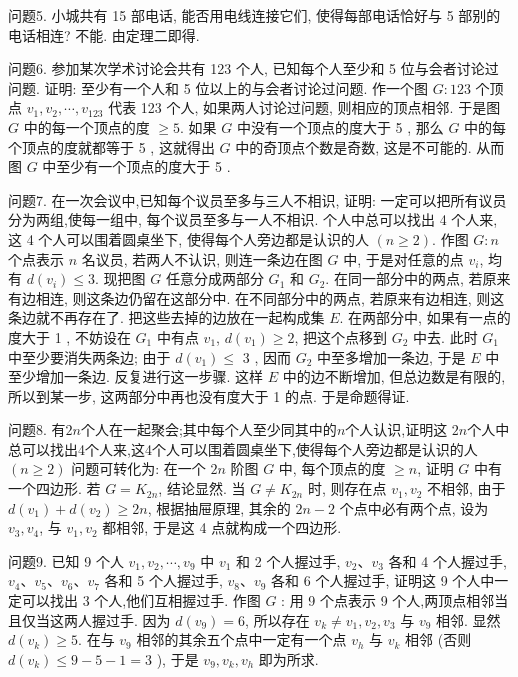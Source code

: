 问题5. 小城共有 15 部电话, 能否用电线连接它们, 使得每部电话恰好与 5 部别的电话相连?
不能.
由定理二即得.



问题6. 参加某次学术讨论会共有 123 个人, 已知每个人至少和 5 位与会者讨论过问题.
证明: 至少有一个人和 5 位以上的与会者讨论过问题.
作一个图 $G: 123$ 个顶点 $v_1, v_2, \cdots, v_{123}$ 代表 123 个人, 如果两人讨论过问题, 则相应的顶点相邻.
于是图 $G$ 中的每一个顶点的度 $\geqslant 5$.
如果 $G$ 中没有一个顶点的度大于 5 , 那么 $G$ 中的每个顶点的度就都等于 5 , 这就得出 $G$ 中的奇顶点个数是奇数, 这是不可能的.
从而图 $G$ 中至少有一个顶点的度大于 5 .



问题7. 在一次会议中,已知每个议员至多与三人不相识, 证明: 一定可以把所有议员分为两组,使每一组中, 每个议员至多与一人不相识.
个人中总可以找出 4 个人来, 这 4 个人可以围着圆桌坐下, 使得每个人旁边都是认识的人 $(n \geqslant 2)$.
作图 $G: n$ 个点表示 $n$ 名议员, 若两人不认识, 则连一条边在图 $G$ 中, 于是对任意的点 $v_i$, 均有 $d\left(v_i\right) \leqslant 3$. 现把图 $G$ 任意分成两部分 $G_1$ 和 $G_2$. 在同一部分中的两点, 若原来有边相连, 则这条边仍留在这部分中.
在不同部分中的两点, 若原来有边相连, 则这条边就不再存在了.
把这些去掉的边放在一起构成集 $E$. 在两部分中, 如果有一点的度大于 1 , 不妨设在 $G_1$ 中有点 $v_1$, $d\left(v_1\right) \geqslant 2$, 把这个点移到 $G_2$ 中去.
此时 $G_1$ 中至少要消失两条边; 由于 $d\left(v_1\right) \leqslant$ 3 , 因而 $G_2$ 中至多增加一条边, 于是 $E$ 中至少增加一条边.
反复进行这一步骤.
这样 $E$ 中的边不断增加, 但总边数是有限的, 所以到某一步, 这两部分中再也没有度大于 1 的点.
于是命题得证.



问题8. 有$2n$个人在一起聚会;其中每个人至少同其中的$n$个人认识,证明这 $2n$个人中总可以找出4个人来,这4个人可以围着圆桌坐下,使得每个人旁边都是认识的人 $(n\geq2)$ 
问题可转化为: 在一个 $2 n$ 阶图 $G$ 中, 每个顶点的度 $\geqslant n$, 证明 $G$ 中有一个四边形.
若 $G=K_{2 n}$, 结论显然.
当 $G \neq K_{2 n}$ 时, 则存在点 $v_1, v_2$ 不相邻, 由于 $d\left(v_1\right)+d\left(v_2\right) \geqslant 2 n$, 根据抽屉原理, 其余的 $2 n-2$ 个点中必有两个点, 设为 $v_3, v_4$, 与 $v_1, v_2$ 都相邻, 于是这 4 点就构成一个四边形.



问题9. 已知 9 个人 $v_1, v_2, \cdots, v_9$ 中 $v_1$ 和 2 个人握过手, $v_2 、 v_3$ 各和 4 个人握过手, $v_4 、 v_5 、 v_6 、 v_7$ 各和 5 个人握过手, $v_8 、 v_9$ 各和 6 个人握过手, 证明这 9 个人中一定可以找出 3 个人,他们互相握过手.
作图 $G$ : 用 9 个点表示 9 个人,两顶点相邻当且仅当这两人握过手.
因为 $d\left(v_9\right)=6$, 所以存在 $v_k \neq v_1, v_2, v_3$ 与 $v_9$ 相邻.
显然 $d\left(v_k\right) \geqslant 5$. 在与 $v_9$ 相邻的其余五个点中一定有一个点 $v_h$ 与 $v_k$ 相邻 (否则 $d\left(v_k\right) \leqslant 9-5-1=3$ ), 于是 $v_9, v_k, v_h$ 即为所求.



